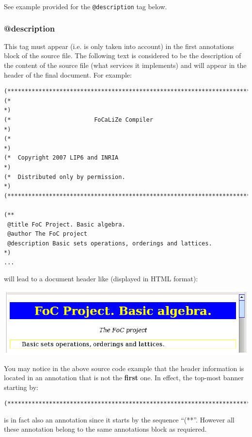 See example provided for the {\tt @description} tag below.



\subsubsection{@description}
This tag must appear (i.e. is only taken into account) in the first
annotations block of the source file. The following text is considered
to be the description of the content of the source file (what services
it implements) and will appear in the header of the final
document. For example:

{\scriptsize
\begin{lstlisting}
(***********************************************************************)
(*                                                                     *)
(*                        FoCaLiZe Compiler                            *)
(*                                                                     *)
(*  Copyright 2007 LIP6 and INRIA                                      *)
(*  Distributed only by permission.                                    *)
(***********************************************************************)

(**
 @title FoC Project. Basic algebra.
 @author The FoC project
 @description Basic sets operations, orderings and lattices.
*)
...
\end{lstlisting}}

\noindent will lead to a document header like (displayed in HTML format):

\medskip
\includegraphics{header_html_snapshot.ps}

You may notice in the above source code example that the header
information is located in an annotation that is not the {\bf first}
one. In effect, the top-most banner starting by:

{\scriptsize
\begin{lstlisting}
(***********************************************************************)
\end{lstlisting}}

\noindent is in fact also an annotation since it starts by the sequence
``(**''. However all these annotation belong to the same annotations
block as requiered.



